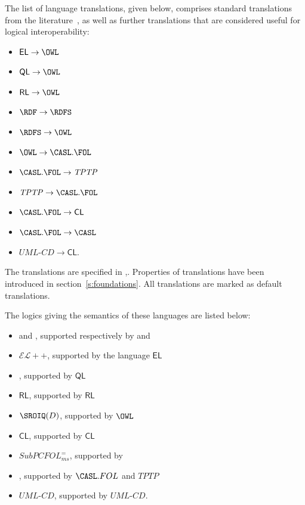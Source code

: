\documentclass[10pt, a4paper]{isov2}
\makeatletter
\newcommand*\CommentAuthor{}
\renewcommand*\CommentAuthor{#1}}
\newcommand*\CommentDate{}
\renewcommand*\CommentDate{#1}}
\newcommand*\CommentId{}
\renewcommand*\CommentId{#1}}
\newcommand*\CommentType{}
\renewcommand*\CommentType{#1}}
\newcommand*{\SetCommentColorByType}[1]{%
\edef\localType{{#1}}%
\expandafter\ifstrequal\localType{q-aut}{\colorlet{CommentColor}{red}}{%
\expandafter\ifstrequal\localType{q-all}{\colorlet{CommentColor}{orange}}{%
\expandafter\ifstrequal\localType{todo}{\colorlet{CommentColor}{orange}}{%
\expandafter\ifstrequal\localType{fyi}{\colorlet{CommentColor}{lightgray}}{%
\colorlet{CommentColor}{yellow}}}}}}
\newcommand*{\SetCommentPrefixByType}[1]{%
\edef\localType{{#1}}%
\expandafter\@ifmtarg\localType{%
\edef\CommentPrefix{}%
}{%
\caseupper[q]{#1}%
\edef\CommentPrefix{\thestring: }%
}}
\newcommand*{\initComment}[1]{%
\setkeys{Comment}{#1}%
\SetCommentColorByType{\CommentType}%
\relax%
\SetCommentPrefixByType{\CommentType}%
\relax%
}
\newcommand*{\todonote}[2][]{%
\initComment{#1}%
\pdfcomment[author=\CommentAuthor,color=CommentColor,date=\CommentDate,id=\CommentId]{%
\CommentPrefix
#2}}
\renewcommand*{\todonote}[2][]{%
\initComment{#1}%
\ednote{\CommentPrefix #2}}
\newcommand*{\CL}{\ensuremath{\mathsf{CL}}\xspace}
\newcommand{\QL}{\ensuremath{\mathsf{QL}}\xspace}
\newcommand{\RL}{\ensuremath{\mathsf{RL}}\xspace}
\newcommand{\EL}{\ensuremath{\mathsf{EL}}\xspace}
\newcommand{\ELDL}{\ensuremath{\mathcal{EL}}\xspace}
\makeatother
\begin{document}
The list of language translations, given below, comprises standard
translations from the literature~\cite{OntoGraph,MossakowskiEtAl14b}, as
well as further translations that are considered useful for logical
interoperability:
 \begin{itemize} 
  \item $\EL \to \OWL$ 
  \item $\QL \to \OWL$
  \item $\RL \to \OWL$
  \item $\RDF \to \RDFS$
  \item $\RDFS \to \OWL$
  \item $\OWL  \to \CASL.\FOL$
  \item $\CASL.\FOL \to \mathit{TPTP}$
  \item $\mathit{TPTP} \to \CASL.\FOL$
  \item $\CASL.\FOL \to \CL$
  \item $\CASL.\FOL \to \CASL$
  \item $\mathit{UML\textit{-}CD} \to \CL$.
 \end{itemize} 

The translations are specified in \cite{OntoGraph},\cite{MossakowskiEtAl14b}.
Properties of translations have been introduced in section~\ref{s:foundations}.
All translations are marked as default translations. 




The logics giving the semantics of these languages are listed below:
 \begin{itemize} 
 \item \RDF and \RDFS, supported respectively by \RDF and \RDFS
 \item $\ELDL{+}{+}$, supported by the language \EL
 \item \DLLiteR, supported by \QL
 \item \RL, supported by \RL
 \item $\SROIQ(D)$, supported by $\OWL$
 \item \CL, supported by \CL
 \item $SubPCFOL^=_{ms}$, supported by \CASL
 \item \FOL, supported by $\CASL.FOL$ and $TPTP$
 \item $UML\mbox{-}CD$, supported by $UML\mbox{-}CD$.
 \end{itemize} 
\end{document}

